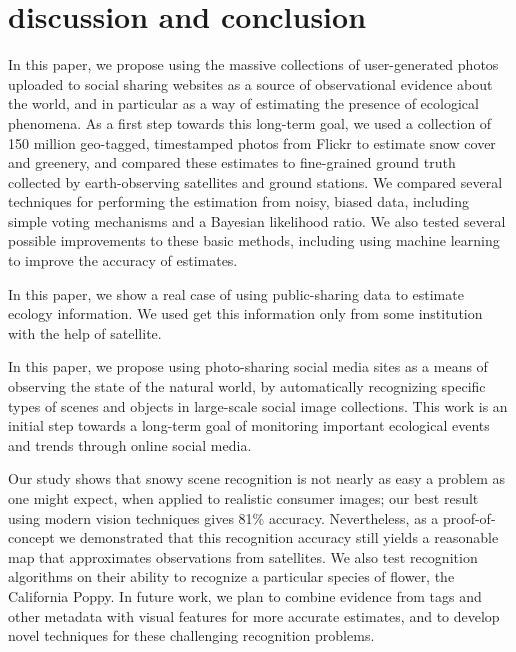 \section{discussion and conclusion}




In this paper, we propose using the massive collections of
user-generated photos uploaded to social sharing websites as a source
of observational evidence about the world, and in particular as a way
of estimating the presence of ecological phenomena. As a first step
towards this long-term goal, we used a collection of 150 million
geo-tagged, timestamped photos from Flickr to estimate snow 
cover and greenery, and compared these estimates to fine-grained
ground truth collected by earth-observing satellites and ground stations. We compared
several techniques for performing the estimation from noisy, biased
data, including simple voting mechanisms and a Bayesian likelihood
ratio. We also tested several possible improvements to these basic
methods, including using 
machine learning to improve the accuracy of estimates.

In this paper, we show a real case of using public-sharing data to estimate ecology information.
We used get this information only from some institution with the help of satellite.


In this paper, we propose using photo-sharing social media sites as a
means of observing the state of the natural world, by automatically
recognizing specific types of scenes and objects in large-scale social
image collections. This work is an initial step towards a long-term
goal of monitoring important ecological events and trends through
online social media.  




Our study shows that snowy scene recognition is
not nearly as easy a problem as one might expect, when applied to realistic
consumer images; our best result using
modern vision techniques gives 81\% accuracy. Nevertheless, as a proof-of-concept
we demonstrated that this recognition accuracy still yields a reasonable
map that approximates observations from satellites.
We also test recognition algorithms on their ability to recognize a
particular species of flower, the California Poppy. In future work, we
plan to combine evidence from tags and other metadata with visual
features for more accurate estimates, and to develop novel techniques
for these challenging recognition problems. 

